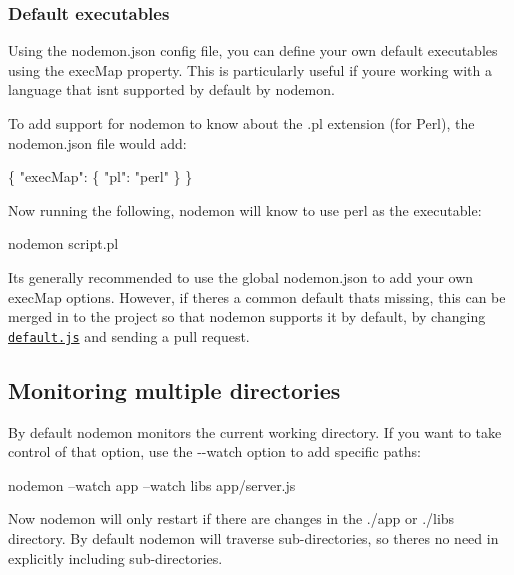 \subsubsection*{Default executables}

Using the {\ttfamily nodemon.\+json} config file, you can define your own default executables using the {\ttfamily exec\+Map} property. This is particularly useful if you\textquotesingle{}re working with a language that isn\textquotesingle{}t supported by default by nodemon.

To add support for nodemon to know about the {\ttfamily .pl} extension (for Perl), the {\ttfamily nodemon.\+json} file would add\+:


\begin{DoxyCode}
\{
  "execMap": \{
    "pl": "perl"
  \}
\}
\end{DoxyCode}


Now running the following, nodemon will know to use {\ttfamily perl} as the executable\+:


\begin{DoxyCode}
nodemon script.pl
\end{DoxyCode}


It\textquotesingle{}s generally recommended to use the global {\ttfamily nodemon.\+json} to add your own {\ttfamily exec\+Map} options. However, if there\textquotesingle{}s a common default that\textquotesingle{}s missing, this can be merged in to the project so that nodemon supports it by default, by changing \href{https://github.com/remy/nodemon/blob/master/lib/config/defaults.js}{\tt default.\+js} and sending a pull request.

\subsection*{Monitoring multiple directories}

By default nodemon monitors the current working directory. If you want to take control of that option, use the {\ttfamily -\/-\/watch} option to add specific paths\+:


\begin{DoxyCode}
nodemon --watch app --watch libs app/server.js
\end{DoxyCode}


Now nodemon will only restart if there are changes in the {\ttfamily ./app} or {\ttfamily ./libs} directory. By default nodemon will traverse sub-\/directories, so there\textquotesingle{}s no need in explicitly including sub-\/directories.

